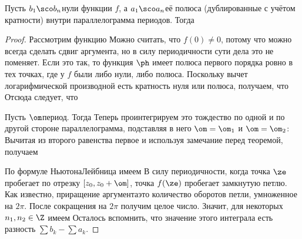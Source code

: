 \documentclass[a4paper]{article}
\begin{document}
\begin{theorem}
Пусть $b_1\sco b_n$\т нули функции $f$, а $a_1\sco a_n$\т её полюса (дублированные
с учётом кратности) внутри параллелограмма периодов. Тогда
\end{theorem}
\begin{proof}
Рассмотрим функцию
Можно считать, что $f(0) \neq 0$, потому что можно всегда сделать сдвиг аргумента, но в силу периодичности
сути дела это не поменяет. Если это так, то функция $\ph$ имеет полюса первого порядка ровно в тех
точках, где у $f$ были либо нули, либо полюса. Поскольку вычет логарифмической производной есть кратность
нуля или полюса, получаем, что
Отсюда следует, что

Пусть $\om$\т период. Тогда
Теперь проинтегрируем это тождество по одной и по другой стороне параллелограмма, подставляя в него
$\om = \om_1$ и $\om = \om_2$:
Вычитая из второго равенства первое и используя замечание перед теоремой, получаем

По формуле Ньютона\ч Лейбница имеем
В силу периодичности, когда точка $\ze$ пробегает по отрезку $[z_0,z_0+\om]$, точка $f(\ze)$ пробегает
замкнутую петлю. Как известно, приращение аргумента\т это количество оборотов петли, умноженное на $2\pi$.
После сокращения на $2\pi$ получим целое число. Значит, для некоторых $n_1,n_2\in\Z$ имеем
Осталось вспомнить, что значение этого интеграла есть разность $\sum b_k - \sum a_k$.
\end{proof}
\end{document}
